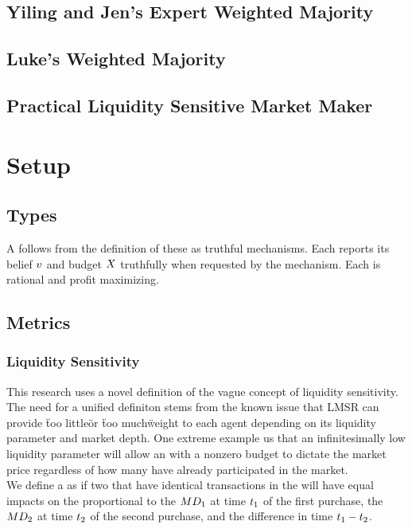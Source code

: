 \subsection{Yiling and Jen's Expert Weighted Majority}
\subsection{Luke's Weighted Majority}
\subsection{Practical Liquidity Sensitive Market Maker}

\section{Setup}

\subsection{Types}
A  follows from the definition of these  as truthful
mechanisms. Each  reports its belief $v$ and budget $X$
truthfully when requested by the mechanism. Each  is rational and profit
maximizing.

\subsection{Metrics}
\subsubsection{Liquidity Sensitivity}
This research uses a novel definition of the vague concept of liquidity sensitivity. The need
for a unified definiton stems from the known issue that LMSR can provide \"too little\" or 
\"too much\" weight to each agent depending on its liquidity parameter and market depth. One extreme
example us that an infinitesimally low liquidity parameter will allow an  with a nonzero
budget to dictate the market price regardless of how many  have already participated in
the market.\\

We define a  as  if two  that have identical
transactions in the  will have equal impacts on the  proportional to 
the  $MD_{1}$ at time $t_{1}$ of the first purchase, the  
$MD_{2}$ at time $t_{2}$ of the second purchase, and the difference in time $t_{1} - t_{2}$.\\

